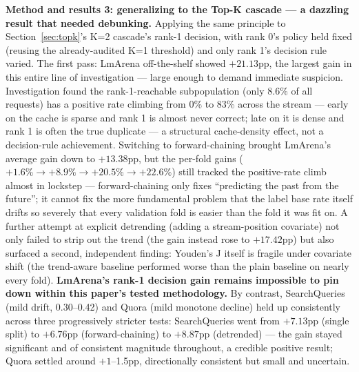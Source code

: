 \documentclass[11pt]{article}
\begin{document}
\textbf{Method and results 3: generalizing to the Top-K cascade --- a dazzling result that needed debunking.} Applying the same principle to Section~\ref{sec:topk}'s K=2 cascade's rank-1 decision, with rank 0's policy held fixed (reusing the already-audited K=1 threshold) and only rank 1's decision rule varied. The first pass: LmArena off-the-shelf showed $+21.13$pp, the largest gain in this entire line of investigation --- large enough to demand immediate suspicion. Investigation found the rank-1-reachable subpopulation (only 8.6\% of all requests) has a positive rate climbing from 0\% to 83\% across the stream --- early on the cache is sparse and rank 1 is almost never correct; late on it is dense and rank 1 is often the true duplicate --- a structural cache-density effect, not a decision-rule achievement. Switching to forward-chaining brought LmArena's average gain down to $+13.38$pp, but the per-fold gains ($+1.6\%\to+8.9\%\to+20.5\%\to+22.6\%$) still tracked the positive-rate climb almost in lockstep --- forward-chaining only fixes ``predicting the past from the future''; it cannot fix the more fundamental problem that the label base rate itself drifts so severely that every validation fold is easier than the fold it was fit on. A further attempt at explicit detrending (adding a stream-position covariate) not only failed to strip out the trend (the gain instead rose to $+17.42$pp) but also surfaced a second, independent finding: Youden's J itself is fragile under covariate shift (the trend-aware baseline performed worse than the plain baseline on nearly every fold). \textbf{LmArena's rank-1 decision gain remains impossible to pin down within this paper's tested methodology.} By contrast, SearchQueries (mild drift, 0.30--0.42) and Quora (mild monotone decline) held up consistently across three progressively stricter tests: SearchQueries went from $+7.13$pp (single split) to $+6.76$pp (forward-chaining) to $+8.87$pp (detrended) --- the gain stayed significant and of consistent magnitude throughout, a credible positive result; Quora settled around $+1$--1.5pp, directionally consistent but small and uncertain.
\end{document}
